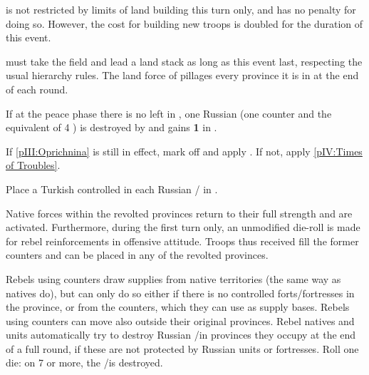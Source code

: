 \phadm
\aparag \RUS is not restricted by limits of land building this turn only, and
has no penalty for doing so. %
However, the cost for building new troops is doubled for the duration of this
event.

\phmil
\aparag {} must take the field and lead a land stack as long
as this event last, respecting the usual hierarchy rules.
\aparag The land force of  pillages every province it is in
at the end of each round.

\phpaix
\aparag If at the peace phase there is no \REVOLT left in \RUS, one Russian
\ARMY (one counter and the equivalent of 4 \DT) is destroyed by \RUS and \RUS
gains {\bf 1} in \STAB.





\condition{}
\aparag If \ref{pIII:Oprichnina} is still in effect, mark off and apply \RD.
\aparag If not, apply \ref{pIV:Times of Troubles}.






\phevnt
\aparag Place a Turkish controlled \REVOLT \facemoins in each Russian \COL/\TP
in .

\phadm
\aparag Native forces within the revolted provinces return to their full
strength and are activated.
\aparag Furthermore, during the first turn only, an unmodified die-roll is
made for rebel reinforcements in offensive attitude. Troops thus received fill
the former \payssiberie counters and can be placed in any of the revolted
provinces.

\phmil
\aparag Rebels using \payssiberie counters draw supplies from native
territories (the same way as natives do), but can only do so either if there
is no \RUS controlled forts/fortresses in the province, or from the \REVOLT
counters, which they can use as supply bases.
\aparag Rebels using \payssiberie counters can move also outside their
original provinces.
\aparag Rebel natives and \payssiberie units automatically try to destroy
Russian \COL/\TP in provinces they occupy at the end of a full round, if these
are not protected by Russian units or fortresses. Roll one die: on 7 or more,
the \COL/\TP is destroyed.

